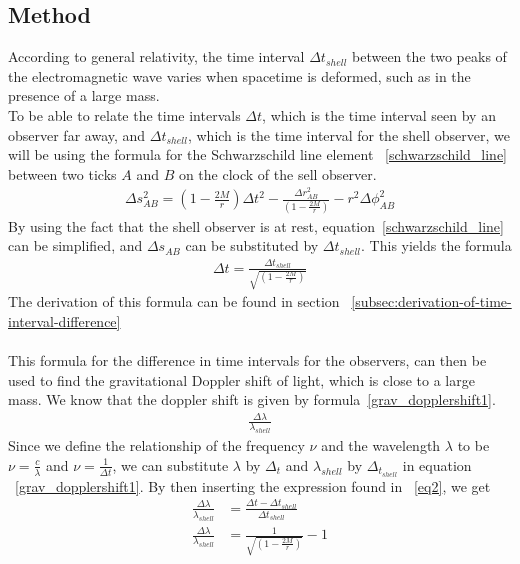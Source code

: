 \documentclass[reprint,english,notitlepage]{revtex4-2}
\begin{document}
    \subsection{Method}\label{subsec:method1}
        According to general relativity, the time interval $\Delta t_{shell}$ between the two peaks of the electromagnetic wave varies when spacetime is deformed, such as in the presence of a large mass.\\
        To be able to relate the time intervals $\Delta t$, which is the time interval seen by an observer far away, and $\Delta t_{shell}$, which is the time interval for the shell observer, we will be using the formula for the Schwarzschild line element ~\eqref{schwarzschild_line} between two ticks $A$ and $B$ on the clock of the sell observer.
        \begin{align}
            \Delta s^2_{AB} = \left(1-\frac{2M}{r}\right) \Delta t^2 - \frac{\Delta r^2_{AB}}{\left(1-\frac{2M}{r}\right)} - r^2 \Delta \phi^2_{AB} \label{schwarzschild_line}
        \end{align}
        By using the fact that the shell observer is at rest, equation~\eqref{schwarzschild_line} can be simplified, and $\Delta s_{AB}$ can be substituted by $\Delta t_{shell}$.
        This yields the formula
        \begin{align}
                \Delta t = \frac{\Delta t_{shell}}{\sqrt{\left(1-\frac{2M}{r}\right)}} \label{eq2}
        \end{align}
        The derivation of this formula can be found in section ~\ref{subsec:derivation-of-time-interval-difference}\\\\

        This formula for the difference in time intervals for the observers, can then be used to find the gravitational Doppler shift of light, which is close to a large mass.
        We know that the doppler shift is given by formula~\eqref{grav_dopplershift1}.
        \begin{align}
            \frac{\Delta \lambda}{\lambda_{shell}} \label{grav_dopplershift1}
        \end{align}
        Since we define the relationship of the frequency $\nu$ and the wavelength $\lambda$ to be $\nu = \frac{c}{\lambda}$ and $\nu = \frac{1}{\Delta t}$, we can substitute $\lambda$ by $\Delta_t$ and $\lambda_{shell}$ by $\Delta_t_{shell}$ in equation ~\eqref{grav_dopplershift1}.
        By then inserting the expression found in ~\eqref{eq2}, we get
        \begin{align}
            \frac{\Delta \lambda}{\lambda_{shell}} &= \frac{\Delta t - \Delta t_{shell}}{\Delta t_{shell}}\\
            \frac{\Delta \lambda}{\lambda_{shell}} &= \frac{1}{\sqrt{\left(1-\frac{2M}{r}\right)}} - 1
        \end{align}\\\\
\end{document}

